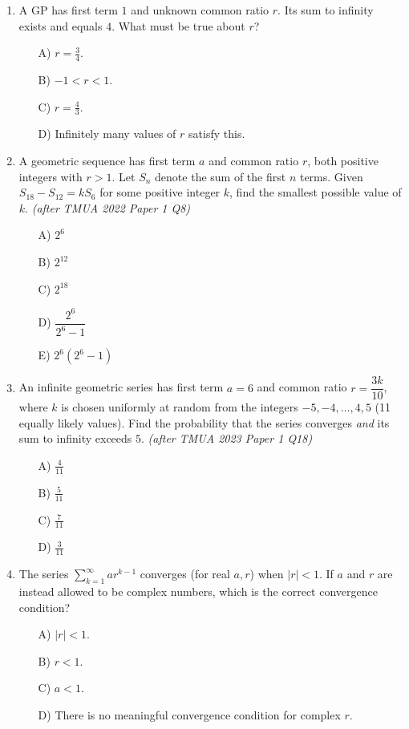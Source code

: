 \documentclass[11pt,a4paper]{article}
\begin{document}
\begin{enumerate}

\item A GP has first term $1$ and unknown common ratio $r$. Its sum to infinity exists and equals $4$. What must be true about $r$?
\begin{itemize}
\item[A)] $r=\tfrac34$.
\item[B)] $-1<r<1$.
\item[C)] $r=\tfrac43$.
\item[D)] Infinitely many values of $r$ satisfy this.
\end{itemize}

\item A geometric sequence has first term $a$ and common ratio $r$, both positive integers with $r>1$. Let $S_n$ denote the sum of the first $n$ terms. Given $S_{18}-S_{12}=kS_6$ for some positive integer $k$, find the smallest possible value of $k$. \textit{\small(after TMUA 2022 Paper 1 Q8)}
\begin{itemize}
\item[A)] $2^6$
\item[B)] $2^{12}$
\item[C)] $2^{18}$
\item[D)] $\dfrac{2^6}{2^6-1}$
\item[E)] $2^6(2^6-1)$
\end{itemize}

\item An infinite geometric series has first term $a=6$ and common ratio $r=\dfrac{3k}{10}$, where $k$ is chosen uniformly at random from the integers $-5,-4,\ldots,4,5$ (11 equally likely values). Find the probability that the series converges \emph{and} its sum to infinity exceeds $5$. \textit{\small(after TMUA 2023 Paper 1 Q18)}
\begin{itemize}
\item[A)] $\tfrac4{11}$
\item[B)] $\tfrac5{11}$
\item[C)] $\tfrac7{11}$
\item[D)] $\tfrac3{11}$
\end{itemize}

\item The series $\sum_{k=1}^\infty ar^{k-1}$ converges (for real $a,r$) when $|r|<1$. If $a$ and $r$ are instead allowed to be complex numbers, which is the correct convergence condition?
\begin{itemize}
\item[A)] $|r|<1$.
\item[B)] $r<1$.
\item[C)] $a<1$.
\item[D)] There is no meaningful convergence condition for complex $r$.
\end{itemize}


\end{enumerate}
\end{document}
